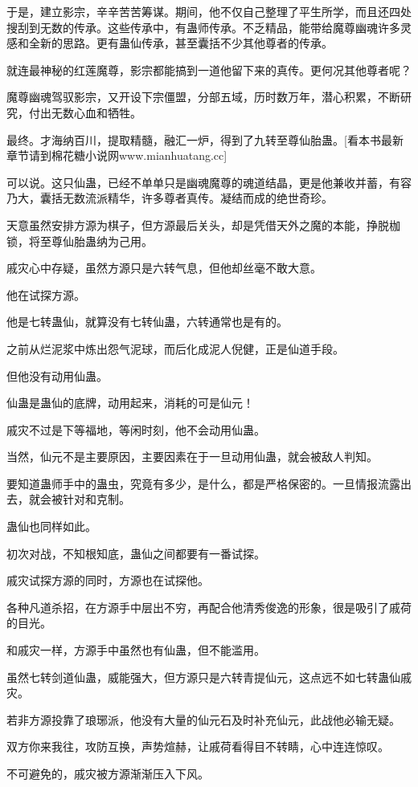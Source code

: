 \begin{this_body}
于是，建立影宗，辛辛苦苦筹谋。期间，他不仅自己整理了平生所学，而且还四处搜刮到无数的传承。这些传承中，有蛊师传承。不乏精品，能带给魔尊幽魂许多灵感和全新的思路。更有蛊仙传承，甚至囊括不少其他尊者的传承。

就连最神秘的红莲魔尊，影宗都能搞到一道他留下来的真传。更何况其他尊者呢？

魔尊幽魂驾驭影宗，又开设下宗僵盟，分部五域，历时数万年，潜心积累，不断研究，付出无数心血和牺牲。

最终。才海纳百川，提取精髓，融汇一炉，得到了九转至尊仙胎蛊。[看本书最新章节请到棉花糖小说网www.mianhuatang.cc]

可以说。这只仙蛊，已经不单单只是幽魂魔尊的魂道结晶，更是他兼收并蓄，有容乃大，囊括无数流派精华，许多尊者真传。凝结而成的绝世奇珍。

天意虽然安排方源为棋子，但方源最后关头，却是凭借天外之魔的本能，挣脱枷锁，将至尊仙胎蛊纳为己用。

戚灾心中存疑，虽然方源只是六转气息，但他却丝毫不敢大意。

他在试探方源。

他是七转蛊仙，就算没有七转仙蛊，六转通常也是有的。

之前从烂泥浆中炼出怨气泥球，而后化成泥人倪健，正是仙道手段。

但他没有动用仙蛊。

仙蛊是蛊仙的底牌，动用起来，消耗的可是仙元！

戚灾不过是下等福地，等闲时刻，他不会动用仙蛊。

当然，仙元不是主要原因，主要因素在于一旦动用仙蛊，就会被敌人判知。

要知道蛊师手中的蛊虫，究竟有多少，是什么，都是严格保密的。一旦情报流露出去，就会被针对和克制。

蛊仙也同样如此。

初次对战，不知根知底，蛊仙之间都要有一番试探。

戚灾试探方源的同时，方源也在试探他。

各种凡道杀招，在方源手中层出不穷，再配合他清秀俊逸的形象，很是吸引了戚荷的目光。

和戚灾一样，方源手中虽然也有仙蛊，但不能滥用。

虽然七转剑道仙蛊，威能强大，但方源只是六转青提仙元，这点远不如七转蛊仙戚灾。

若非方源投靠了琅琊派，他没有大量的仙元石及时补充仙元，此战他必输无疑。

双方你来我往，攻防互换，声势煊赫，让戚荷看得目不转睛，心中连连惊叹。

不可避免的，戚灾被方源渐渐压入下风。


\end{this_body}
